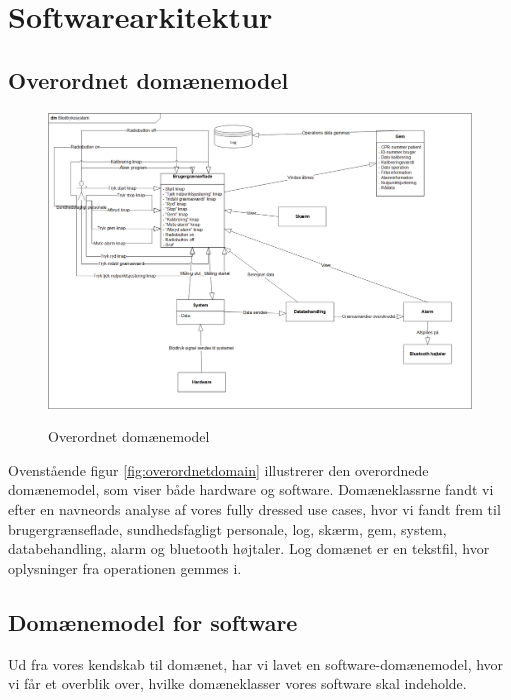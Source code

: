 \section{Softwarearkitektur}

\subsection{Overordnet domænemodel}
	\begin{figure}[h!]
	\centering
	\includegraphics[width=1\linewidth]{Arkitektur_og_design/Softwarearkitektur/overordnetdomain}
	\label{fig:overordnetdomain}
	\caption{Overordnet domænemodel}
\end{figure}

Ovenstående figur \vref{fig:overordnetdomain} illustrerer den overordnede domænemodel, som viser både hardware og software. Domæneklassrne fandt vi efter en navneords analyse af vores fully dressed use cases, hvor vi fandt frem til brugergrænseflade, sundhedsfagligt personale, log, skærm, gem, system, databehandling, alarm og bluetooth højtaler.  Log domænet er en tekstfil, hvor oplysninger fra operationen gemmes i.

\subsection{Domænemodel for software}
  
Ud fra vores kendskab til domænet, har vi lavet en software-domænemodel, hvor vi får et overblik over, hvilke domæneklasser vores software skal indeholde. 

\clearpage

